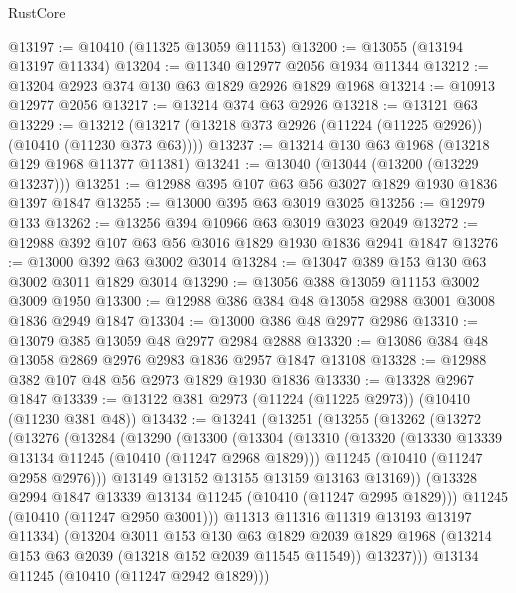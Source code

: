 \begin{lexlean}{RustCore}
\begin{coremodule}
@13197 := @10410 (@11325 @13059 @11153)
@13200 := @13055 (@13194 @13197 @11334)
@13204 := @11340 @12977 @2056 @1934 @11344
@13212 := @13204 @2923 @374 @130 @63 @1829 @2926 @1829 @1968
@13214 := @10913 @12977 @2056
@13217 := @13214 @374 @63 @2926
@13218 := @13121 @63
@13229 := @13212 (@13217 (@13218 @373 @2926 (@11224 (@11225 @2926)) (@10410 (@11230 @373 @63))))
@13237 := @13214 @130 @63 @1968 (@13218 @129 @1968 @11377 @11381)
@13241 := @13040 (@13044 (@13200 (@13229 @13237)))
@13251 := @12988 @395 @107 @63 @56 @3027 @1829 @1930 @1836 @1397 @1847
@13255 := @13000 @395 @63 @3019 @3025
@13256 := @12979 @133
@13262 := @13256 @394 @10966 @63 @3019 @3023 @2049
@13272 := @12988 @392 @107 @63 @56 @3016 @1829 @1930 @1836 @2941 @1847
@13276 := @13000 @392 @63 @3002 @3014
@13284 := @13047 @389 @153 @130 @63 @3002 @3011 @1829 @3014
@13290 := @13056 @388 @13059 @11153 @3002 @3009 @1950
@13300 := @12988 @386 @384 @48 @13058 @2988 @3001 @3008 @1836 @2949 @1847
@13304 := @13000 @386 @48 @2977 @2986
@13310 := @13079 @385 @13059 @48 @2977 @2984 @2888
@13320 := @13086 @384 @48 @13058 @2869 @2976 @2983 @1836 @2957 @1847 @13108
@13328 := @12988 @382 @107 @48 @56 @2973 @1829 @1930 @1836
@13330 := @13328 @2967 @1847
@13339 := @13122 @381 @2973 (@11224 (@11225 @2973)) (@10410 (@11230 @381 @48))
@13432 := @13241
    (@13251
      (@13255
        (@13262
          (@13272
            (@13276
              (@13284
                (@13290
                  (@13300
                    (@13304
                      (@13310
                        (@13320
                          (@13330 @13339 @13134 @11245 (@10410 (@11247 @2968 @1829)))
                          @11245
                          (@10410 (@11247 @2958 @2976)))
                        @13149
                        @13152
                        @13155
                        @13159
                        @13163
                        @13169))
                    (@13328 @2994 @1847 @13339 @13134 @11245 (@10410 (@11247 @2995 @1829)))
                    @11245
                    (@10410 (@11247 @2950 @3001)))
                  @11313
                  @11316
                  @11319
                  @13193
                  @13197
                  @11334)
                (@13204
                  @3011
                  @153
                  @130
                  @63
                  @1829
                  @2039
                  @1829
                  @1968
                  (@13214 @153 @63 @2039 (@13218 @152 @2039 @11545 @11549))
                  @13237)))
            @13134
            @11245
            (@10410 (@11247 @2942 @1829)))

\end{coremodule}
\end{lexlean}
